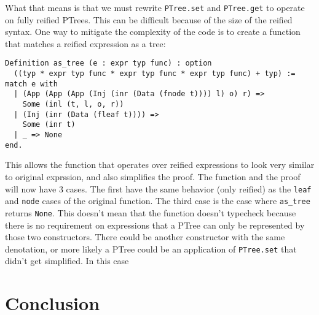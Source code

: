 \documentclass{puthesis}
\begin{document}
What that means is that we must rewrite \lstinline|PTree.set| and \lstinline|PTree.get|
to operate on fully reified PTrees. This can be difficult because of the size 
of the reified syntax. One way to mitigate the complexity of the code is to 
create a function that matches a reified expression as a tree:

\begin{lstlisting}
Definition as_tree (e : expr typ func) : option
  ((typ * expr typ func * expr typ func * expr typ func) + typ) := 
match e with
  | (App (App (App (Inj (inr (Data (fnode t)))) l) o) r) =>
    Some (inl (t, l, o, r))
  | (Inj (inr (Data (fleaf t)))) =>
    Some (inr t)
  | _ => None
end.
\end{lstlisting}

This allows the function that operates over reified expressions to look very
similar to original exprssion, and also simplifies the proof. The function
and the proof will now have 3 cases. The first have the same behavior (only reified)
as the \lstinline|leaf| and \lstinline|node| cases of the original function. The third
case is the case where \lstinline|as_tree| returns \lstinline|None|. This doesn't
mean that the function doesn't typecheck because there is no requirement on 
expressions that a PTree can only be represented by those two constructors. There
could be another constructor with the same denotation, or more likely a PTree
could be an application of \lstinline|PTree.set| that didn't get simplified.
In this case 

\chapter{Conclusion}



\end{document}
